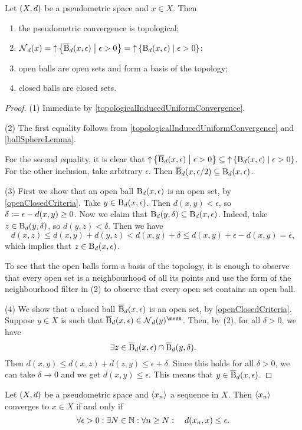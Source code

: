 \begin{lemma} \label{metricConvergenceNeighbourhood}
Let $\sSet{X,d}$ be a pseudometric space and $x\in X$. Then
\begin{enumerate}
\item the pseudometric convergence is topological;
\item $\neighbourhood_d(x) = \upset\setbuilder{\cball_d(x,\epsilon)}{\epsilon >0} = \upset\setbuilder{\ball_d(x,\epsilon)}{\epsilon >0}$;
\item open balls are open sets and form a basis of the topology;
\item closed balls are closed sets.
\end{enumerate}
\end{lemma}
\begin{proof}
(1) Immediate by \ref{topologicalInducedUniformConvergence}.

(2) The first equality follows from \ref{topologicalInducedUniformConvergence} and \ref{ballSphereLemma}.

For the second equality, it is clear that $\upset\setbuilder{\cball_d(x,\epsilon)}{\epsilon >0} \subseteq \upset\setbuilder{\ball_d(x,\epsilon)}{\epsilon >0}$. For the other inclusion, take arbitrary $\epsilon$. Then $\operatorname{\overline{B}}_d(x,\epsilon/2)\subseteq \operatorname{B}_d(x,\epsilon)$.

(3) First we show that an open ball $\operatorname{B}_d(x,\epsilon)$ is an open set, by \ref{openClosedCriteria}. Take $y\in \operatorname{B}_d(x,\epsilon)$. Then $d(x,y)<\epsilon$, so $\delta \coloneqq \epsilon - d(x,y) \geq 0$. Now we claim that $\operatorname{B}_d(y,\delta)\subseteq \operatorname{B}_d(x,\epsilon)$. Indeed, take $z\in \operatorname{B}_d(y,\delta)$, so $d(y,z)<\delta$. Then we have
\[ d(x,z) \leq d(x,y) + d(y,z) < d(x,y) + \delta \leq d(x,y) + \epsilon - d(x,y) = \epsilon, \]
which implies that $z\in \operatorname{B}_d(x,\epsilon)$.

To see that the open balls form a basis of the topology, it is enough to observe that every open set is a neighbourhood of all its points and use the form of the neighbourhood filter in (2) to observe that every open set contains an open ball.

(4) We show that a closed ball $\operatorname{\overline{B}}_d(x,\epsilon)$ is an open set, by \ref{openClosedCriteria}. Suppose $y\in X$ is such that $\cball_d(x,\epsilon) \in \neighbourhood_d(y)^\mesh$. Then, by (2), for all $\delta >0$, we have
\[ \exists z \in \operatorname{\overline{B}}_d(x,\epsilon) \cap \operatorname{\overline{B}}_d(y,\delta). \]
Then $d(x,y) \leq d(x,z) + d(z,y) \leq \epsilon + \delta$. Since this holds for all $\delta > 0$, we can take $\delta \to 0$ and we get $d(x,y) \leq \epsilon$. This means that $y\in \operatorname{\overline{B}}_d(x,\epsilon)$.
\end{proof}
\begin{corollary} \label{metricConvergenceSequence}
Let $\sSet{X,d}$ be a pseudometric space and $\left\langle x_n \right\rangle$ a sequence in $X$. Then $\left\langle x_n \right\rangle$ converges to $x\in X$ \textup{if and only if}
\[ \forall \epsilon>0: \exists N\in\mathbb{N}: \forall n\geq N: \quad d(x_n,x)\leq \epsilon. \]
\end{corollary}

